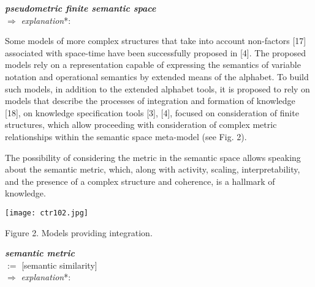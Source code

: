 \documentclass{article}
\begin{document}
\begin{multicols}{2}
\begin{tabbing}
\textbf{\textit{pseudometric finite semantic space}} \\ $\Rightarrow$ \hspace{0.5cm} \= \textit{explanation}*: \\ 

\end{tabbing}

\hspace{0.27cm}Some models of more complex structures that take
into account non-factors [17] associated with space-time
have been successfully proposed in [4]. The proposed
models rely on a representation capable of expressing the
semantics of variable notation and operational semantics
by extended means of the alphabet. To build such models,
in addition to the extended alphabet tools, it is proposed to
rely on models that describe the processes of integration
and formation of knowledge [18], on knowledge specification tools [3], [4], focused on consideration of finite
structures, which allow proceeding with consideration of
complex metric relationships within the semantic space
meta-model (see Fig. 2).

\hspace{0.27cm}The possibility of considering the metric in the semantic
space allows speaking about the semantic metric, which,
along with activity, scaling, interpretability, and the
presence of a complex structure and coherence, is a
hallmark of knowledge.


\texttt{[image: ctr102.jpg]}


\begin{center}
\scriptsize Figure 2. Models providing integration.
\end{center}

\begin{tabbing}
\textbf{\textit{semantic metric}} \\ $:=$ \hspace{0.5cm} [semantic similarity] \\   $\Rightarrow$ \hspace{0.5cm} \= \textit{explanation}*: \\ 
\end{tabbing}


\end{multicols}
\end{document}
